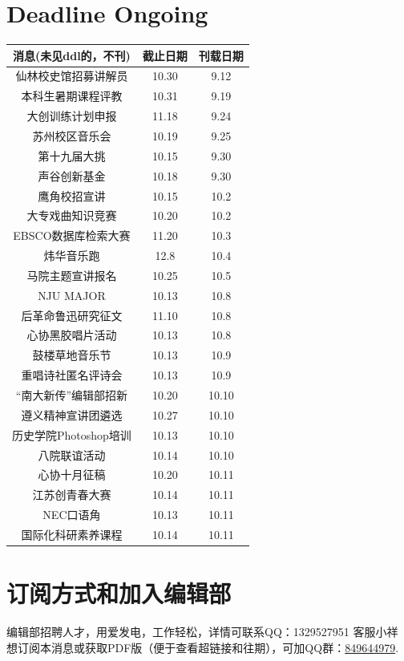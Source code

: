 \documentclass[letterpaper, 12pt]{article}
\begin{document}
\begin{multicols}{2}
\section{Deadline Ongoing}
\begin{tabular}{|c|c|c|}
    \hline
    消息(未见ddl的，不刊) & 截止日期 & 刊载日期\\
    \hline\hline
    仙林校史馆招募讲解员 & 10.30 & 9.12\\
    本科生暑期课程评教 & 10.31 & 9.19\\
    大创训练计划申报 & 11.18 & 9.24\\
    苏州校区音乐会 & 10.19 & 9.25\\
    第十九届大挑 & 10.15 & 9.30\\
    声谷创新基金 & 10.18 & 9.30\\
    鹰角校招宣讲 & 10.15 & 10.2\\
    大专戏曲知识竞赛 & 10.20 & 10.2\\
    EBSCO数据库检索大赛 & 11.20 & 10.3\\
    炜华音乐跑 & 12.8 & 10.4\\
    马院主题宣讲报名 & 10.25 & 10.5\\
    NJU MAJOR & 10.13 & 10.8\\
    后革命鲁迅研究征文 & 11.10 & 10.8\\
    心协黑胶唱片活动 & 10.13 & 10.8\\
    鼓楼草地音乐节 & 10.13 & 10.9\\
    重唱诗社匿名评诗会 & 10.13 & 10.9\\
    “南大新传”编辑部招新 & 10.20 & 10.10\\
    遵义精神宣讲团遴选 & 10.27 & 10.10\\
    历史学院Photoshop培训 & 10.13 & 10.10\\
    八院联谊活动 & 10.14 & 10.10\\
    心协十月征稿 & 10.20 & 10.11\\
    江苏创青春大赛 & 10.14 & 10.11\\
    NEC口语角 & 10.13 & 10.11\\
    国际化科研素养课程 & 10.14 & 10.11\\
    \hline
\end{tabular}
\section{订阅方式和加入编辑部}
编辑部招聘人才，用爱发电，工作轻松，详情可联系QQ：1329527951 客服小祥\\想订阅本消息或获取PDF版（便于查看超链接和往期），可加QQ群：\href{https://qm.qq.com/q/FGX1VYCrGS}{849644979}.

\end{multicols}
\end{document}
